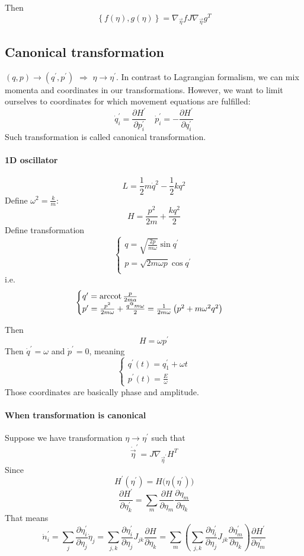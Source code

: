 Then
$$\left\{ f(\eta), g(\eta) \right\} = \nabla_{\vec{\eta}}  f J \nabla_{\vec{\eta}}  g^T$$

\subsection{Canonical transformation}
$(q,p) \to (q^\prime, p^\prime)$ $\Rightarrow$ $\eta \to \eta^\prime$.
In contrast to Lagrangian formalism, we can mix momenta and coordinates in our transformations. However, we want to limit ourselves to coordinates for which movement equations are fulfilled:
$$\dot{q}^\prime_i = \frac{\partial H^\prime}{\partial p^\prime_i} \quad \dot{p}^\prime_i = -\frac{\partial H^\prime}{\partial q^\prime_i}$$
Such transformation is called canonical transformation.
\paragraph{1D oscillator}
$$L = \frac{1}{2}m\dot{q}^2 - \frac{1}{2}kq^2$$
Define $\omega^2 = \frac{k}{m}$:
$$H = \frac{p^2}{2m} + \frac{kq^2}{2}$$
Define transformation 
$$\begin{cases}
q = \sqrt{\frac{2p}{m\omega}} \sin q^\prime\\
p = \sqrt{2m\omega p} \cos q^\prime\\
\end{cases}$$
i.e.
$$\begin{cases}
q^\prime = \operatorname{arccot} \frac{p}{2ma}\\
p^\prime = \frac{p^2}{2m\omega} + \frac{q^@m\omega}{2} = \frac{1}{2m\omega} \left(p^2+m\omega^2 q^2\right) \\
\end{cases}$$

Then
$$H =\omega p^\prime$$
Then $\dot{q}^\prime = \omega$ and $\dot{p}^\prime = 0$, meaning
$$\begin{cases}
q^\prime(t) = q_1^\prime + \omega t\\
p^\prime(t) = \frac{E}{\omega}
\end{cases}$$
Those coordinates are basically phase and amplitude.

\paragraph{When transformation is canonical}
Suppose we have transformation $\eta \to \eta^\prime$ such that
$$\dot{\vec{\eta}}^\prime = J \nabla_{\vec{\eta}^\prime} H^T$$
Since
$$H^\prime(\eta^\prime) = H\big( \eta (\eta^\prime) \big) $$
$$\frac{\partial H^\prime}{\partial \eta^\prime_k} = \sum_m \frac{\partial H}{\partial \eta_m}\frac{\partial \eta_m}{\partial \eta_k}$$
That means
$$\dot{n}_i^\prime =  \sum_j \frac{\partial \eta^\prime_i}{\partial \eta_j} \dot{\eta}_j= \sum_{j,k} \frac{\partial \eta^\prime_i}{\partial \eta_j} J_{jk} \frac{\partial H}{\partial \eta_k} = \sum_m \left(\sum_{j,k}\frac{\partial \eta^\prime_i}{\partial \eta_j}  J_{jk}  \frac{\partial \eta^\prime_m}{\partial \eta_k}\right)\frac{\partial H^\prime}{\partial \eta^\prime_m}$$

